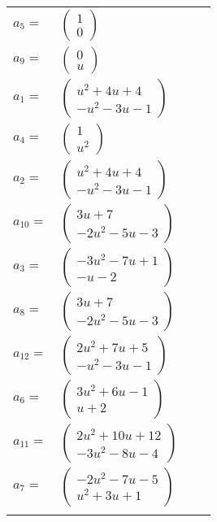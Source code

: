 \documentclass[1p]{elsarticle_modified}
\theoremstyle{definition}
\begin{document}
\begin{tabular}{m{7pt} m{180pt} m{7pt} m{180pt} }
\flushright $a_{5}=$&$\begin{pmatrix}1\\0\end{pmatrix}$ \\
\flushright $a_{9}=$&$\begin{pmatrix}0\\u\end{pmatrix}$ \\
\flushright $a_{1}=$&$\begin{pmatrix}u^2+4 u+4\\- u^2-3 u-1\end{pmatrix}$ \\
\flushright $a_{4}=$&$\begin{pmatrix}1\\u^2\end{pmatrix}$ \\
\flushright $a_{2}=$&$\begin{pmatrix}u^2+4 u+4\\- u^2-3 u-1\end{pmatrix}$ \\
\flushright $a_{10}=$&$\begin{pmatrix}3 u+7\\-2 u^2-5 u-3\end{pmatrix}$ \\
\flushright $a_{3}=$&$\begin{pmatrix}-3 u^2-7 u+1\\- u-2\end{pmatrix}$ \\
\flushright $a_{8}=$&$\begin{pmatrix}3 u+7\\-2 u^2-5 u-3\end{pmatrix}$ \\
\flushright $a_{12}=$&$\begin{pmatrix}2 u^2+7 u+5\\- u^2-3 u-1\end{pmatrix}$ \\
\flushright $a_{6}=$&$\begin{pmatrix}3 u^2+6 u-1\\u+2\end{pmatrix}$ \\
\flushright $a_{11}=$&$\begin{pmatrix}2 u^2+10 u+12\\-3 u^2-8 u-4\end{pmatrix}$ \\
\flushright $a_{7}=$&$\begin{pmatrix}-2 u^2-7 u-5\\u^2+3 u+1\end{pmatrix}$\\&\end{tabular}
\end{document}
